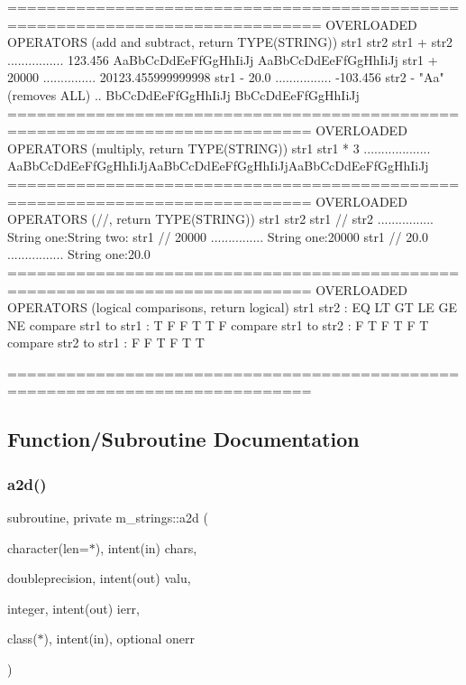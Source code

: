 \begin{DoxyVerb}
==============================================================================
OVERLOADED OPERATORS (add and subtract, return TYPE(STRING))
str1%
str2%
str1 + str2 ................ 123.456 AaBbCcDdEeFfGgHhIiJj AaBbCcDdEeFfGgHhIiJj
str1 + 20000 ............... 20123.455999999998
str1 - 20.0 ................ -103.456
str2 - "Aa" (removes ALL) .. BbCcDdEeFfGgHhIiJj BbCcDdEeFfGgHhIiJj
=============================================================================
OVERLOADED OPERATORS (multiply, return TYPE(STRING))
str1%
str1 * 3 ................... AaBbCcDdEeFfGgHhIiJjAaBbCcDdEeFfGgHhIiJjAaBbCcDdEeFfGgHhIiJj
=============================================================================
OVERLOADED OPERATORS (//, return TYPE(STRING))
str1%
str2%
str1 // str2 ................ String one:String two:
str1 // 20000 ............... String one:20000
str1 // 20.0 ................ String one:20.0
=============================================================================
OVERLOADED OPERATORS (logical comparisons, return logical)
str1%
str2%
: EQ LT GT LE GE NE
compare str1 to str1
:  T  F  F  T  T  F
compare str1 to str2
:  F  T  F  T  F  T
compare str2 to str1
:  F  F  T  F  T  T
\end{DoxyVerb}
 ============================================================================= 

\subsection{Function/\+Subroutine Documentation}
\mbox{\label{namespacem__strings_a8a18024e04cc697243355de3d61e171c}} 
\subsubsection{\texorpdfstring{a2d()}{a2d()}}
{\footnotesize\ttfamily subroutine, private m\+\_\+strings\+::a2d (\begin{DoxyParamCaption}\item[{character(len=$\ast$), intent(in)}]{chars,  }\item[{doubleprecision, intent(out)}]{valu,  }\item[{integer, intent(out)}]{ierr,  }\item[{class($\ast$), intent(in), optional}]{onerr }\end{DoxyParamCaption})\hspace{0.3cm}{\ttfamily [private]}}



